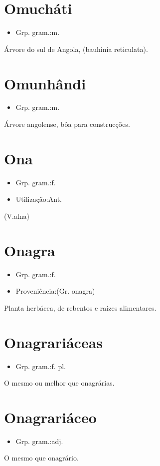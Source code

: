 \section{Omucháti}
\begin{itemize}
\item {Grp. gram.:m.}
\end{itemize}
Árvore do sul de Angola, (\textunderscore bauhinia reticulata\textunderscore ).
\section{Omunhândi}
\begin{itemize}
\item {Grp. gram.:m.}
\end{itemize}
Árvore angolense, bôa para construcções.
\section{Ona}
\begin{itemize}
\item {Grp. gram.:f.}
\end{itemize}
\begin{itemize}
\item {Utilização:Ant.}
\end{itemize}
(V.alna)
\section{Onagra}
\begin{itemize}
\item {Grp. gram.:f.}
\end{itemize}
\begin{itemize}
\item {Proveniência:(Gr. \textunderscore onagra\textunderscore )}
\end{itemize}
Planta herbácea, de rebentos e raízes alimentares.
\section{Onagrariáceas}
\begin{itemize}
\item {Grp. gram.:f. pl.}
\end{itemize}
O mesmo ou melhor que \textunderscore onagrárias\textunderscore .
\section{Onagrariáceo}
\begin{itemize}
\item {Grp. gram.:adj.}
\end{itemize}
O mesmo que \textunderscore onagrário\textunderscore .
